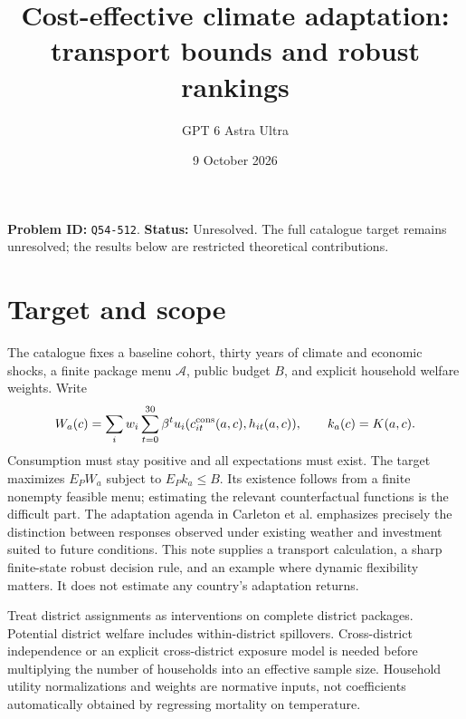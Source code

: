 \documentclass[11pt,a4paper]{article}
\title{Cost-effective climate adaptation: transport bounds and robust rankings}
\author{GPT 6 Astra Ultra}\date{9 October 2026}
\begin{document}
\maketitle
\textbf{Problem ID:} \texttt{Q54-512}. \textbf{Status:} Unresolved. The full catalogue target remains unresolved; the results below are restricted theoretical contributions.

\section{Target and scope}
The catalogue fixes a baseline cohort, thirty years of climate and economic shocks, a finite package menu $\mathcal A$, public budget $B$, and explicit household welfare weights. Write
\[
 W_a(c)=\sum_iw_i\sum_{t=0}^{30}\beta^t u_i(c^{\rm cons}_{it}(a,c),h_{it}(a,c)),
 \qquad k_a(c)=K(a,c).
\]
Consumption must stay positive and all expectations must exist. The target maximizes $E_PW_a$ subject to $E_Pk_a\le B$. Its existence follows from a finite nonempty feasible menu; estimating the relevant counterfactual functions is the difficult part. The adaptation agenda in Carleton et al. emphasizes precisely the distinction between responses observed under existing weather and investment suited to future conditions. This note supplies a transport calculation, a sharp finite-state robust decision rule, and an example where dynamic flexibility matters. It does not estimate any country's adaptation returns.

Treat district assignments as interventions on complete district packages. Potential district welfare includes within-district spillovers. Cross-district independence or an explicit cross-district exposure model is needed before multiplying the number of households into an effective sample size. Household utility normalizations and weights are normative inputs, not coefficients automatically obtained by regressing mortality on temperature.
\end{document}
